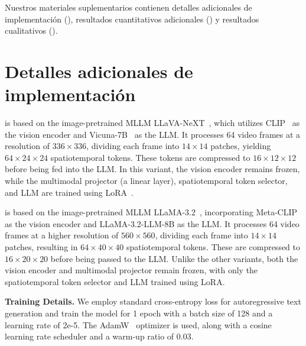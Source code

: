 \clearpage
\maketitlesupplementary

\setcounter{section}{0}
\setcounter{figure}{0}
\setcounter{table}{0}

\renewcommand{\thesection}{S\arabic{section}}
\renewcommand{\thetable}{S\arabic{table}}
\renewcommand{\thefigure}{S\arabic{figure}}

Nuestros materiales suplementarios contienen detalles adicionales de implementación (), resultados cuantitativos adicionales () y resultados cualitativos ().

\section{Detalles adicionales de implementación}
\label{sec:additional implementation}

\noindent \textbf{\modelLlava} is based on the image-pretrained MLLM LLaVA-NeXT~\cite{liu2024llavanext}, which utilizes CLIP~\cite{radford2021learning} as the vision encoder and Vicuna-7B~\cite{vicuna2023} as the LLM. It processes 64 video frames at a resolution of $336\times 336$, dividing each frame into $14\times 14$ patches, yielding $64\times 24\times 24$ spatiotemporal tokens. These tokens are compressed to $16\times 12\times 12$ before being fed into the LLM. In this variant, the vision encoder remains frozen, while the multimodal projector (a linear layer), spatiotemporal token selector, and LLM are trained using LoRA~\cite{hu2021lora}.

\noindent \textbf{\modelLlama} is based on the image-pretrained MLLM LLaMA-3.2~\cite{llama3.2}, incorporating Meta-CLIP~\cite{xu2023demystifying} as the vision encoder and LLaMA-3.2-LLM-8B as the LLM. It processes 64 video frames at a higher resolution of $560\times 560$, dividing each frame into $14\times 14$ patches, resulting in $64\times 40\times 40$ spatiotemporal tokens. These are compressed to $16\times 20\times 20$ before being passed to the LLM. Unlike the other variants, both the vision encoder and multimodal projector remain frozen, with only the spatiotemporal token selector and LLM trained using LoRA.


\noindent\textbf{Training Details.} We employ standard cross-entropy loss for autoregressive text generation and train the model for 1 epoch with a batch size of 128 and a learning rate of 
2e-5. The AdamW~\cite{loshchilov2017fixing} optimizer is used, along with a cosine learning rate scheduler and a warm-up ratio of 0.03.

